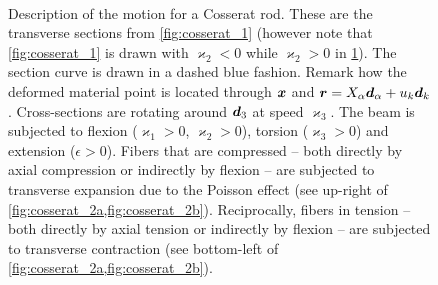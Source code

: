 \begin{figure}[p]
	\begin{fullpage}
		\captionsetup[subfloat]{captionskip=10pt}
     		\centering
		\hspace{2.5cm}
		 \\
		\vspace{20pt}
		\hspace{2.5cm}
		\vspace{20pt}
		\caption[Description of the motion for a Cosserat rod : transverse section]{Description of the motion for a Cosserat rod. These are the transverse sections from \cref{fig:cosserat_1} (however note that \cref{fig:cosserat_1} is drawn with $\varkappa_2 < 0$ while $\varkappa_2 > 0$ in \cref{fig:cosserat_2}). The section curve is drawn in a dashed blue fashion. Remark how the deformed material point is located through $\boldsymbol{x}$ and $\boldsymbol{r} = X_{\alpha}\boldsymbol{d}_{\alpha} + u_{k}\boldsymbol{d}_{k}$. Cross-sections are rotating around $\boldsymbol{d}_3$ at speed $\varkappa_3$. The beam is subjected to flexion ($\varkappa_1 > 0$, $\varkappa_2 > 0$), torsion ($\varkappa_3 > 0$) and extension ($\epsilon > 0$). Fibers that are compressed -- both directly by axial compression or indirectly by flexion -- are subjected to transverse expansion due to the Poisson effect (see up-right of \cref{fig:cosserat_2a,fig:cosserat_2b}). Reciprocally, fibers in tension -- both directly by axial tension or indirectly by flexion -- are subjected to transverse contraction (see bottom-left of \cref{fig:cosserat_2a,fig:cosserat_2b}).}
		\label{fig:cosserat_2}    
	\end{fullpage}
\end{figure}

